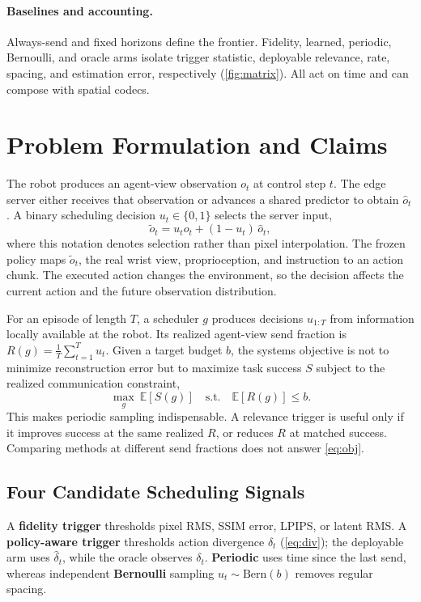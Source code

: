 \documentclass[sigconf,10pt,anonymous,review]{acmart}
\newcommand{\dt}{\delta_t}
\newcommand{\dth}{\hat{\delta}_t}
\begin{document}
\paragraph{Baselines and accounting.}
Always-send and fixed horizons define the frontier. Fidelity, learned,
periodic, Bernoulli, and oracle arms isolate trigger statistic, deployable
relevance, rate, spacing, and estimation error, respectively
(\cref{fig:matrix}). All act on time and can compose with spatial codecs.
\section{Problem Formulation and Claims}

The robot produces an agent-view observation $o_t$ at control step $t$. The
edge server either receives that observation or advances a shared predictor
to obtain $\hat o_t$. A binary scheduling decision $u_t\in\{0,1\}$ selects the
server input,
\begin{equation}
\tilde o_t = u_t o_t + (1-u_t)\,\hat o_t,
\end{equation}
where this notation denotes selection rather than pixel interpolation. The
frozen policy maps $\tilde o_t$, the real wrist view, proprioception, and
instruction to an action chunk. The executed action changes the environment,
so the decision affects the current action and the future observation
distribution.

For an episode of length $T$, a scheduler $g$ produces decisions $u_{1:T}$
from information locally available at the robot. Its realized agent-view send
fraction is $R(g)=\frac1T\sum_{t=1}^{T}u_t$. Given a target budget $b$, the
systems objective is not to minimize reconstruction error but to maximize
task success $S$ subject to the realized communication constraint,
\begin{equation}
\max_{g}\ \mathbb{E}[S(g)] \quad\text{s.t.}\quad \mathbb{E}[R(g)]\le b.
\label{eq:obj}
\end{equation}
This makes periodic sampling indispensable. A relevance trigger is
useful only if it improves success at the same realized $R$, or reduces $R$ at
matched success. Comparing methods at different send fractions does not
answer \cref{eq:obj}.

\subsection{Four Candidate Scheduling Signals}
A \textbf{fidelity trigger} thresholds pixel RMS, SSIM error, LPIPS, or latent
RMS. A \textbf{policy-aware trigger} thresholds action divergence $\dt$
(\cref{eq:div}); the deployable arm uses $\dth$, while the oracle observes
$\dt$. \textbf{Periodic} uses time since the last send, whereas independent
\textbf{Bernoulli} sampling $u_t\sim\mathrm{Bern}(b)$ removes regular spacing.
\end{document}
